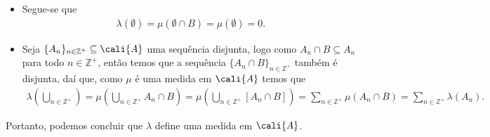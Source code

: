 \begin{homeworkProblem}[3]
\begin{solution}
\begin{enumerate}[a)]
\begin{itemize}
\begin{align*}
        \end{align*}
      \item Segue-se que
        \begin{align*}
          \lambda(\emptyset)=\mu(\emptyset\cap B)=\mu(\emptyset)=0.
        \end{align*}
      \item Seja $\{A_n\}_{n\in\mathbb{Z}^{+}}\subseteq\cali{A}$ uma sequência disjunta, logo como $A_n\cap B\subseteq A_n$ para todo $n\in\mathbb{Z}^{+}$, então temos que a sequência $\{A_n\cap B\}_{n\in\mathbb{Z}^{+}}$ também é disjunta, daí que, como $\mu$ é uma medida em $\cali{A}$ temos que 
        \begin{align*}
          \lambda\left( \bigcup_{n\in\mathbb{Z}^{+}} \right)=\mu\left( \bigcup_{n\in\mathbb{Z}^{+}}A_n\cap B \right)=\mu\left( \bigcup_{n\in\mathbb{Z}^{+}}[A_n\cap B] \right)=\sum_{n\in\mathbb{Z}^{+}}\mu(A_n\cap B)=\sum_{n\in\mathbb{Z}^{+}}\lambda(A_n).
        \end{align*}
    \end{itemize}
    Portanto, podemos concluir que $\lambda$ define uma medida em $\cali{A}$. 
  \end{enumerate}
  \end{solution}
\end{homeworkProblem}
